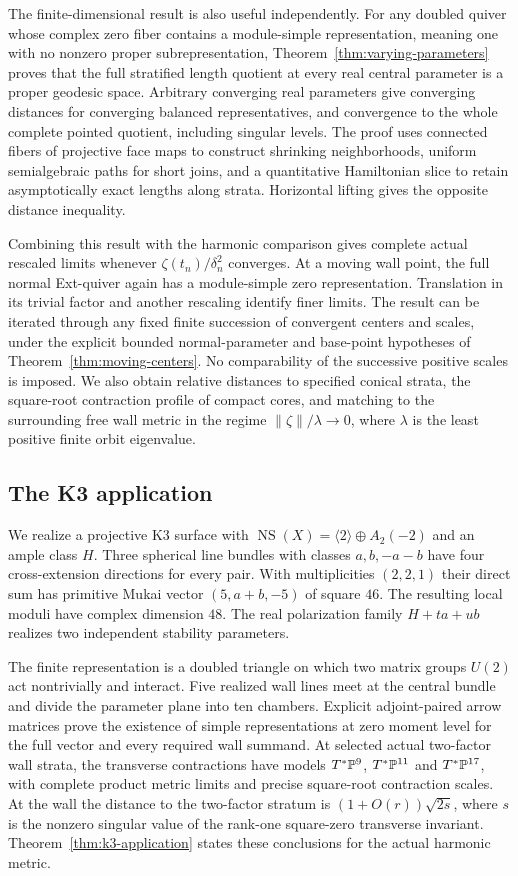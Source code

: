The finite-dimensional result is also useful independently.
For any doubled quiver whose complex zero fiber contains a
module-simple representation, meaning one with no nonzero proper
subrepresentation, Theorem~\ref{thm:varying-parameters}
proves that the full stratified length quotient at every real
central parameter is a proper geodesic space.
Arbitrary converging real parameters give converging distances
for converging balanced representatives, and convergence to the
whole complete pointed quotient, including singular levels.
The proof uses connected fibers of projective face maps to
construct shrinking neighborhoods, uniform semialgebraic paths
for short joins, and a quantitative Hamiltonian slice to retain
asymptotically exact lengths along strata. Horizontal lifting
gives the opposite distance inequality.

Combining this result with the harmonic comparison gives complete
actual rescaled limits whenever $\zeta(t_n)/\delta_n^2$ converges.
At a moving wall point, the full normal Ext-quiver again has a
module-simple zero representation. Translation in its trivial
factor and another rescaling identify finer limits.
The result can be iterated through any fixed finite succession
of convergent centers and scales, under the explicit bounded
normal-parameter and base-point hypotheses of
Theorem~\ref{thm:moving-centers}. No comparability of the successive
positive scales is imposed.
We also obtain relative distances to specified conical strata,
the square-root contraction profile of compact cores, and
matching to the surrounding free wall metric in the regime
$\|\zeta\|/\lambda\to0$, where $\lambda$ is the least positive
finite orbit eigenvalue.

\subsection{The K3 application}
We realize a projective K3 surface with
$\operatorname{NS}(X)=\langle2\rangle\oplus A_2(-2)$ and an ample
class $H$. Three spherical line bundles with classes $a,b,-a-b$
have four cross-extension directions for every pair. With
multiplicities $(2,2,1)$ their direct sum has primitive Mukai
vector $(5,a+b,-5)$ of square $46$.
The resulting local moduli have complex dimension $48$.
The real polarization family $H+ta+ub$ realizes two independent
stability parameters.

The finite representation is a doubled triangle on which two
matrix groups $U(2)$ act nontrivially and interact.
Five realized wall lines meet at the central bundle and divide
the parameter plane into ten chambers.
Explicit adjoint-paired arrow matrices prove the existence of simple
representations at zero moment level for the full vector and every required wall
summand. At selected actual two-factor wall strata, the transverse
contractions have models $T^*\mathbb P^9$, $T^*\mathbb P^{11}$ and
$T^*\mathbb P^{17}$, with complete product metric limits and precise
square-root contraction scales. At the wall the distance to the
two-factor stratum is $(1+O(r))\sqrt{2s}$, where $s$ is the nonzero
singular value of the rank-one square-zero transverse invariant.
Theorem~\ref{thm:k3-application} states these conclusions for the
actual harmonic metric.

